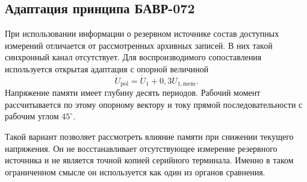 \subsection{Адаптация принципа БАВР-072}
\label{sec:ch5_bavr072_proxy}

При использовании информации
о резервном источнике
состав доступных измерений
отличается от рассмотренных
архивных записей.
В них такой синхронный канал
отсутствует.
Для воспроизводимого сопоставления
используется открытая адаптация
с опорной величиной
\begin{equation}
 \dot{U}_{\mathrm{pol}}=
 \dot{U}_1+0{,}3\dot{U}_{1,\mathrm{mem}}.
 \label{eq:ch5_bavr072_proxy}
\end{equation}
Напряжение памяти имеет
глубину десять периодов.
Рабочий момент рассчитывается
по этому опорному вектору
и току прямой последовательности
с рабочим углом $45^\circ$.

Такой вариант позволяет
рассмотреть влияние памяти
при снижении текущего напряжения.
Он не восстанавливает
отсутствующее измерение
резервного источника
и не является точной
копией серийного терминала.
Именно в таком ограниченном
смысле он используется
как один из органов сравнения.

{}
